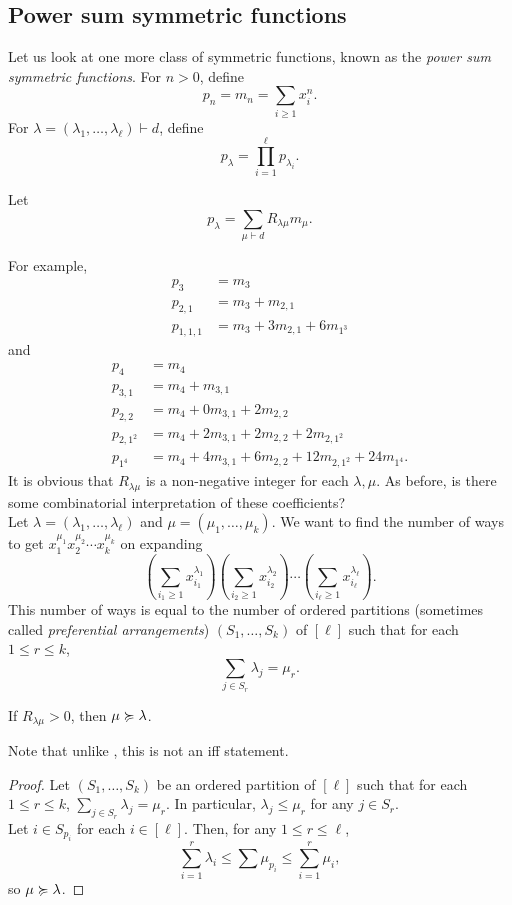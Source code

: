 
\subsection{Power sum symmetric functions}

	Let us look at one more class of symmetric functions, known as the \emph{power sum symmetric functions}. For $n > 0$, define
	\[ p_n = m_n = \sum_{i \ge 1} x_i^n. \]
	For $\lambda = (\lambda_1,\ldots,\lambda_\ell) \vdash d$, define
	\[ p_\lambda = \prod_{i=1}^\ell p_{\lambda_i}. \]

	Let
	\[ p_\lambda = \sum_{\mu \vdash d} R_{\lambda\mu} m_\mu. \]

	For example,
	\begin{align*}
		p_3 &= m_3 \\
		p_{2,1} &= m_3 + m_{2,1} \\
		p_{1,1,1} &= m_3 + 3m_{2,1} + 6m_{1^3}
	\end{align*}
	and
	\begin{align*}
		p_4 &= m_4 \\
		p_{3,1} &= m_4 + m_{3,1} \\
		p_{2,2} &= m_4 + 0m_{3,1} + 2m_{2,2} \\
		p_{2,1^2} &= m_4 + 2m_{3,1} + 2m_{2,2} + 2m_{2,1^2} \\
		p_{1^4} &= m_4 + 4m_{3,1} + 6m_{2,2} + 12m_{2,1^2} + 24m_{1^4}.
	\end{align*}
	It is obvious that $R_{\lambda\mu}$ is a non-negative integer for each $\lambda,\mu$. As before, is there some combinatorial interpretation of these coefficients?\\
	Let $\lambda = (\lambda_1,\ldots,\lambda_\ell)$ and $\mu = (\mu_1,\ldots,\mu_k)$. We want to find the number of ways to get $x_1^{\mu_1} x_2^{\mu_2} \cdots x_k^{\mu_k}$ on expanding
	\[ \left( \sum_{i_1 \ge 1} x_{i_1}^{\lambda_1} \right) \left( \sum_{i_2 \ge 1} x_{i_2}^{\lambda_2} \right) \cdots \left( \sum_{i_\ell \ge 1} x_{i_\ell}^{\lambda_\ell} \right). \]
	This number of ways is equal to the number of ordered partitions (sometimes called \emph{preferential arrangements}) $(S_1,\ldots,S_k)$ of $[\ell]$ such that for each $1 \le r \le k$,
	\[ \sum_{j \in S_r} \lambda_j = \mu_r.  \]

	\begin{ftheo}
		If $R_{\lambda\mu} > 0$, then $\mu \succcurlyeq \lambda$.
	\end{ftheo}
	Note that unlike , this is not an iff statement.
	\begin{proof}
		Let $(S_1,\ldots,S_k)$ be an ordered partition of $[\ell]$ such that for each $1 \le r \le k$, $\sum_{j \in S_r} \lambda_j = \mu_r$. In particular, $\lambda_j \le \mu_r$ for any $j \in S_r$. \\
		Let $i \in S_{p_i}$ for each $i \in [\ell]$. Then, for any $1 \le r \le \ell$,
		\[ \sum_{i=1}^r \lambda_{i} \le \sum \mu_{p_i} \le \sum_{i=1}^r \mu_{i}, \]
		so $\mu \succcurlyeq \lambda$.
	\end{proof}

